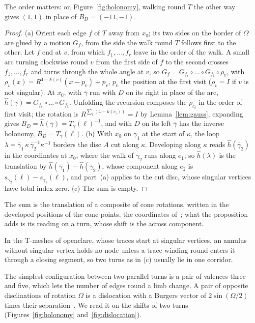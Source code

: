 \documentclass[11pt,a4paper]{article}
\newcommand{\shift}{s}
\begin{document}
The order matters: on Figure~\ref{fig:holonomy}, walking round $T$ the other
way gives $(1, 1)$ in place of $B_D = (-11, -1)$.

\begin{proof}
(a) Orient each edge $f$ of $T$ away from $x_0$; its two sides on the border of
$\Omega$ are glued by a motion $G_f$, from the side the walk round $T$ follows
first to the other. Let $f$ end at $v$, from which $f_1, \dots, f_r$ leave in
the order of the walk. A small arc turning clockwise round $v$ from the first
side of $f$ to the second crosses $f_1, \dots, f_r$ and turns through the
whole angle at $v$, so $G_f = G_{f_r} \circ \dots \circ G_{f_1} \circ
\rho_v$, with $\rho_v(x) = R^{4-k(v)}(x - p_v) + p_v$, $p_v$ the position at
the first visit ($\rho_v = I$ if $v$ is not singular). At $x_0$, with
$\bar\gamma$ run with $D$ on its right in place of the arc, $\hat
h(\bar\gamma) = G_{f_r} \circ \dots \circ G_{f_1}$. Unfolding the
recursion composes the $\rho_{c_i}$ in the order of first visit; the rotation
is $R^{\sum_i(4 - k(c_i))} = I$ by Lemma~\ref{lem:gauss}, expanding gives
$B_D = \hat h(\bar\gamma) = T_\gamma(\ell)^{-1}$, and with $D$ on its left
$\bar\gamma$ has the inverse holonomy, $B_D = T_\gamma(\ell)$. (b) With $x_0$ on $\bar\gamma_1$ at the start of $\kappa$, the loop
$\lambda = \bar\gamma_1\, \kappa\, \bar\gamma_2^{-1} \kappa^{-1}$ borders the
disc $A$ cut along $\kappa$. Developing along $\kappa$ reads $\hat
h(\bar\gamma_2)$ in the coordinates at $x_0$, where the walk of $\gamma_2$
runs along $e_1$; so $\hat h(\lambda)$ is the translation by $\hat
h(\bar\gamma_1) - \hat h(\bar\gamma_2)$, whose component along $e_2$ is
$\shift_{\gamma_2}(\ell) - \shift_{\gamma_1}(\ell)$, and part~(a) applies to the cut disc,
whose singular vertices have total index zero. (c) The sum is empty.
\end{proof}

The sum is the translation of a composite of cone rotations, written in the
developed positions of the cone points, the coordinates
of~\cite{thurston1998shapes}; what the proposition adds is its reading on a
turn, whose shift is the across component.

In the T-meshes of openclare, whose traces start at singular vertices, an
annulus without singular vertex holds no node unless a trace winding round
enters it through a closing segment, so two turns as in (c) usually lie in
one corridor.

The simplest configuration between two parallel turns is a pair of valences
three and five, which lets the number of edges round a limb change. A pair of
opposite disclinations of rotation $\Omega$ is a dislocation with a Burgers
vector of $2\sin(\Omega/2)$ times their
separation~\cite[Eq.~(5)]{kleman2008disclinations}. We read it
on the shifts of two turns (Figures~\ref{fig:holonomy}
and~\ref{fig:dislocation}).
\end{document}
